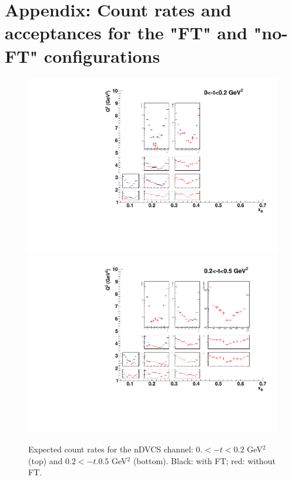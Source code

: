 \appendix
\section{Appendix: Count rates and acceptances for the "FT" and "no-FT" configurations}
\begin{figure}  
\begin{center}
\includegraphics[width=130mm]{plot_counts_1_FT_noFT_100days.pdf}
\includegraphics[width=130mm]{plot_counts_2_FT_noFT_100days.pdf}
\caption{Expected count rates for the nDVCS channel: $0.<-t<0.2$ GeV$^2$ (top) and $0.2<-t.0.5$ GeV$^2$ (bottom). Black: with FT; red: without FT. \label{count_rate_1}
}
\end{center}
\end{figure}
